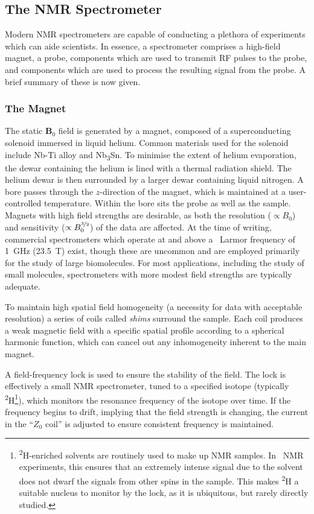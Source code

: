 \subsection{The NMR Spectrometer}

Modern \ac{NMR} spectrometers are capable of conducting a plethora of
experiments which can aide scientists.
In essence, a spectrometer comprises a high-field magnet, a probe, components
which are used to transmit \ac{RF} pulses to the probe, and components which
are used to process the resulting signal from the probe. A brief summary of
these is now given.

\subsubsection{The Magnet}
The static $\symbf{B}_0$ field is generated by a magnet, composed of a
superconducting solenoid immersed in liquid helium. Common materials used for
the solenoid include Nb-Ti alloy and Nb\textsubscript{3}Sn. To minimise the
extent of helium evaporation, the dewar containing the helium is lined with
a thermal radiation shield. The helium dewar is then surrounded by a larger
dewar containing liquid nitrogen. A bore passes through the $z$-direction of
the magnet, which is maintained at a user-controlled temperature. Within the
bore sits the probe as well as the sample. Magnets with high field
strengths are desirable, as both the resolution ($\propto B_0$) and sensitivity ($\propto
B_0^{\nicefrac{3}{2}}$) of the data are affected. At the
time of writing, commercial spectrometers which operate at and above a
\proton\ Larmor frequency of \qty{1}{\giga\hertz} (\qty{23.5}{\tesla}) exist,
though these are uncommon and are employed primarily for the study of large
biomolecules. For most applications, including the study of small molecules,
spectrometers with more modest field strengths are typically adequate.

To maintain high spatial field homogeneity (a necessity for data with
acceptable resolution) a series of coils called \textit{shims} surround the
sample. Each coil produces a weak magnetic field with a specific spatial
profile according to a spherical harmonic function, which can cancel out any
inhomogeneity inherent to the main magnet.

A field-frequency lock is used to ensure the stability of the
field. The lock is effectively a small \ac{NMR} spectrometer, tuned to a
specified isotope (typically \textsuperscript{2}H\footnote{
    \textsuperscript{2}H-enriched solvents are routinely used to make up
    \ac{NMR} samples. In \proton\ \ac{NMR} experiments, this ensures that an
    extremely intense signal due to the solvent does not dwarf the signals from
    other spins in the sample. This makes \textsuperscript{2}H a suitable
    nucleus to monitor by the lock, as it is ubiquitous, but rarely directly
    studied.
}), which monitors the resonance frequency of the isotope over
time. If the frequency begins to drift, implying that the field strength is
changing, the current in the ``$Z_0$ coil'' is adjusted to ensure consistent
frequency is maintained.

